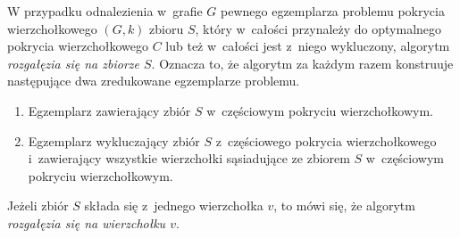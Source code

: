 {\begin{bproof}
  \end{bproof}
  \begin{definition}
    W przypadku odnalezienia w~grafie $G$ pewnego egzemplarza problemu pokrycia wierzchołkowego $(G, k)$ zbioru $S$, który w~całości przynależy do optymalnego pokrycia wierzchołkowego $C$ lub też w~całości jest z~niego wykluczony, algorytm \emph{rozgałęzia się na zbiorze $S$}.
    Oznacza to, że algorytm za każdym razem konstruuje następujące dwa zredukowane egzemplarze problemu.
    \begin{enumerate}
      \item Egzemplarz zawierający zbiór $S$ w~częściowym pokryciu wierzchołkowym.
      \item Egzemplarz wykluczający zbiór $S$ z~częściowego pokrycia wierzchołkowego i~zawierający wszystkie wierzchołki sąsiadujące ze zbiorem $S$ w~częściowym pokryciu wierzchołkowym.
    \end{enumerate}
    Jeżeli zbiór $S$ składa się z~jednego wierzchołka $v$, to mówi się, że algorytm \emph{rozgałęzia się na wierzchołku $v$}.
  \end{definition}
}
